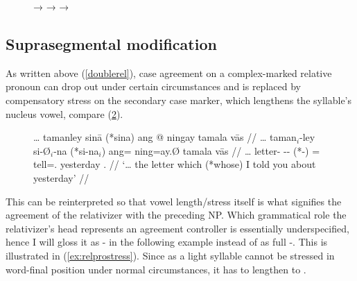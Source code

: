 \begin{figure}[h]
\pex\label{ex:adjredup}
	\a {}
		→ 
	\a {}
		→ 
	\a {}
		→ 
\xe
\end{figure}


\subsection{Suprasegmental modification}

As written above (\autoref{doublerel}), case agreement on a complex-marked
relative pronoun can drop out under certain
circumstances and is replaced by compensatory stress on the secondary case
marker, which lengthens the syllable's nucleus vowel, compare
(\ref{ex:relpromorphphon}).

\begin{figure}[h]
\ex\label{ex:relpromorphphon}
\begingl
	\gla … tamanley sinā \textup{(}*sina\textup{)} ang @ ningay tamala
		vās //
	\glb … taman$_i$-ley si-Ø$_i$-na (*si-na$_i$) ang= ning=ay.Ø tamala vās //
	\glc … letter-\PargI{} \Rel{}-\PatTI{}-\Gen{} (*\Rel{}-\Gen{}) \AgtT{}= 
		tell=\Fsg{}.\Top{} yesterday \Ssg{}.\Parg{} //
	\glft `… the letter which (*whose) I told you about yesterday' //
\endgl\xe
\end{figure}

This can be reinterpreted so that vowel length/stress itself is what signifies
the agreement of the relativizer with the preceding NP. Which grammatical role
the relativizer's head represents an agreement controller is essentially
underspecified, hence I will gloss it as -\Agr{} in the following example
instead of as full -\PargI{}. This is illustrated in (\ref{ex:relprostress}).
Since  as a light syllable cannot be stressed in word-final
position under normal circumstances, it has to lengthen to .

